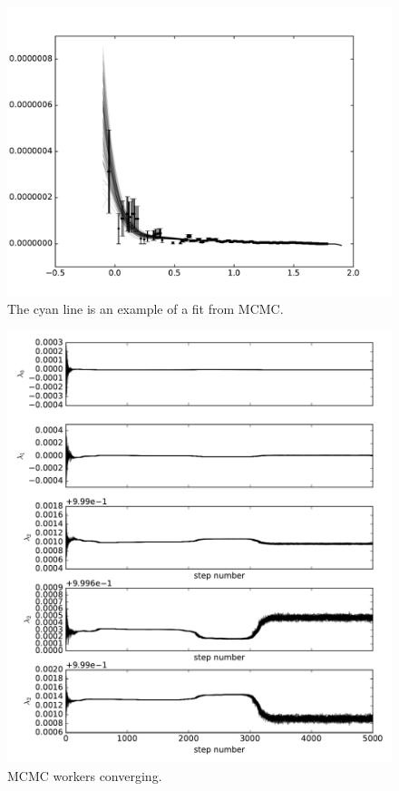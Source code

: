 \begin{figure}[ht]
  \includegraphics[width=\columnwidth]{img/line-MCMC_err.pdf}
  \caption{The cyan line is an example of a fit from MCMC.}
  \label{fig:line_MCMC}
\end{figure}


\begin{figure}[ht]
  \includegraphics[width=\columnwidth]{img/line-time.pdf}
  \caption{MCMC workers converging.}
  \label{fig:MCMC_time}
\end{figure}

